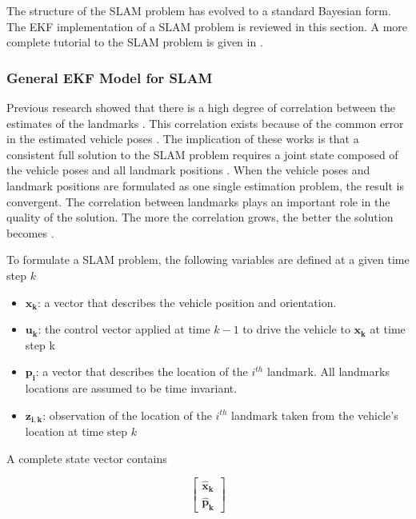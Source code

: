The structure of the SLAM problem has evolved to a standard
Bayesian form. The EKF implementation of a SLAM problem is reviewed in
this section. A more complete tutorial to the SLAM problem is given in
\cite{durrant-whyte_simultaneous_2006}
\cite{bailey_simultaneous_2006}.

\subsubsection{General EKF Model for SLAM}
Previous research showed that there is a high degree of correlation
between the estimates of the landmarks
\cite{smith_representation_1986} \cite{durrant-whyte_uncertain_1988}.
This correlation exists because of the common error in the estimated
vehicle poses \cite{leonard_simultaneous_1991}. The implication of
these works is that a consistent full solution to the SLAM problem
requires a joint state composed of the vehicle poses and all landmark
positions \cite{durrant-whyte_simultaneous_2006}. When the vehicle
poses and landmark positions are formulated as one single estimation
problem, the result is convergent. The correlation between landmarks
plays an important role in the quality of the solution. The more the
correlation grows, the better the solution becomes
\cite{durrant-whyte_localization_1996} \cite{csorba_new_1996}
\cite{csorba_simultaneous_1997} \cite{dissanayake_solution_2001}.

To formulate a SLAM problem, the following variables are defined at a given time step $k$
\begin{itemize}
  \item $\boldsymbol{x_k}$: a vector that describes the vehicle position and
orientation.
  \item $\boldsymbol{u_k}$: the control vector applied at time $k-1$ to drive the
vehicle to $\boldsymbol{x_k}$ at time step k
  \item $\boldsymbol{p_i}$: a vector that describes the location of the $i^{th}$
landmark. All landmarks locations are assumed to be time invariant.
  \item $\boldsymbol{z_{i,k}}$: observation of the location of the $i^{th}$
landmark taken from the vehicle's location at time step $k$
\end{itemize}

\noindent A complete state vector contains 

$$\begin{bmatrix}\boldsymbol{\hat{x}_k} \\ \boldsymbol{\hat{p}_k} \end{bmatrix}$$ 

